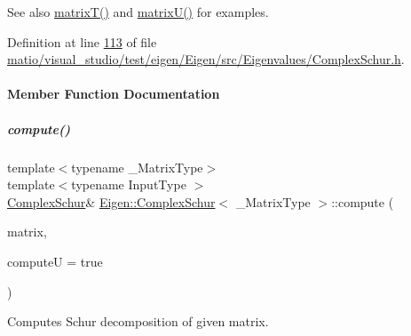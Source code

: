 \begin{DoxySeeAlso}{See also}
\hyperlink{group___eigenvalues___module_add3ab5ed83f7f2f06b79fa910a2d5684}{matrix\+T()} and \hyperlink{group___eigenvalues___module_afed8177cf9836f032d42bdb6c6bc6e01}{matrix\+U()} for examples. 
\end{DoxySeeAlso}


Definition at line \hyperlink{matio_2visual__studio_2test_2eigen_2_eigen_2src_2_eigenvalues_2_complex_schur_8h_source_l00113}{113} of file \hyperlink{matio_2visual__studio_2test_2eigen_2_eigen_2src_2_eigenvalues_2_complex_schur_8h_source}{matio/visual\+\_\+studio/test/eigen/\+Eigen/src/\+Eigenvalues/\+Complex\+Schur.\+h}.



\paragraph{Member Function Documentation}
\mbox{\label{group___eigenvalues___module_a3543d2c286563108cd9ace672bbb1c09}} 
\subparagraph{\texorpdfstring{compute()}{compute()}\hspace{0.1cm}{\footnotesize\ttfamily [1/2]}}
{\footnotesize\ttfamily template$<$typename \+\_\+\+Matrix\+Type$>$ \\
template$<$typename Input\+Type $>$ \\
\hyperlink{group___eigenvalues___module_class_eigen_1_1_complex_schur}{Complex\+Schur}\& \hyperlink{group___eigenvalues___module_class_eigen_1_1_complex_schur}{Eigen\+::\+Complex\+Schur}$<$ \+\_\+\+Matrix\+Type $>$\+::compute (\begin{DoxyParamCaption}\item[{const \hyperlink{group___core___module_struct_eigen_1_1_eigen_base}{Eigen\+Base}$<$ Input\+Type $>$ \&}]{matrix,  }\item[{bool}]{computeU = {\ttfamily true} }\end{DoxyParamCaption})}



Computes Schur decomposition of given matrix. 


